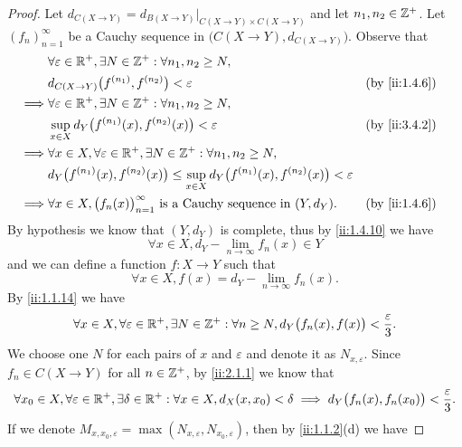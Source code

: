\begin{proof}
  Let \(d_{C(X \to Y)} = d_{B(X \to Y)}|_{C(X \to Y) \times C(X \to Y)}\) and let \(n_1, n_2 \in \mathbb{Z}^+\).
  Let \((f_n)_{n = 1}^\infty\) be a Cauchy sequence in \(\big(C(X \to Y), d_{C(X \to Y)}\big)\).
  Observe that
  \begin{align*}
             & \forall \varepsilon \in \R^+, \exists N \in \Z^+ : \forall n_1, n_2 \geq N,                                                       \\
             & d_{C(X \to Y)}\big(f^{(n_1)}, f^{(n_2)}\big) < \varepsilon                                                        &  & \by{ii:1.4.6} \\
    \implies & \forall \varepsilon \in \R^+, \exists N \in \Z^+ : \forall n_1, n_2 \geq N,                                                       \\
             & \sup_{x \in X} d_Y\big(f^{(n_1)}(x), f^{(n_2)}(x)\big) < \varepsilon                                              &  & \by{ii:3.4.2} \\
    \implies & \forall x \in X, \forall \varepsilon \in \R^+, \exists N \in \Z^+ : \forall n_1, n_2 \geq N,                                      \\
             & d_Y\big(f^{(n_1)}(x), f^{(n_2)}(x)\big) \leq \sup_{x \in X} d_Y\big(f^{(n_1)}(x), f^{(n_2)}(x)\big) < \varepsilon                 \\
    \implies & \forall x \in X, \big(f_n(x)\big)_{n = 1}^\infty \text{ is a Cauchy sequence in } (Y, d_Y).                       &  & \by{ii:1.4.6}
  \end{align*}
  By hypothesis we know that \((Y, d_Y)\) is complete, thus by \cref{ii:1.4.10} we have
  \[
    \forall x \in X, d_Y - \lim_{n \to \infty} f_n(x) \in Y
  \]
  and we can define a function \(f : X \to Y\) such that
  \[
    \forall x \in X, f(x) = d_Y - \lim_{n \to \infty} f_n(x).
  \]
  By \cref{ii:1.1.14} we have
  \[
    \forall x \in X, \forall \varepsilon \in \mathbb{R}^+, \exists N \in \mathbb{Z}^+ : \forall n \geq N, d_Y\big(f_n(x), f(x)\big) < \dfrac{\varepsilon}{3}.
  \]
  We choose one \(N\) for each pairs of \(x\) and \(\varepsilon\) and denote it as \(N_{x, \varepsilon}\).
  Since \(f_n \in C(X \to Y)\) for all \(n \in \mathbb{Z}^+\), by \cref{ii:2.1.1} we know that
  \[
    \forall x_0 \in X, \forall \varepsilon \in \mathbb{R}^+, \exists \delta \in \mathbb{R}^+ : \forall x \in X, d_X(x, x_0) < \delta \implies d_Y\big(f_n(x), f_n(x_0)\big) < \dfrac{\varepsilon}{3}.
  \]
  If we denote \(M_{x, x_0, \varepsilon} = \max(N_{x, \varepsilon}, N_{x_0, \varepsilon})\), then by \cref{ii:1.1.2}(d) we have

\end{proof}

